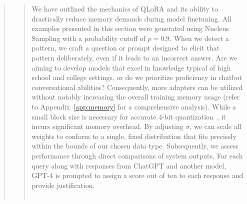 \begin{quote}
{\begin{abstract}
We have outlined the mechanics of QLoRA and its ability to drastically reduce memory demands during model finetuning. All examples presented in this section were generated using Nucleus Sampling \cite{holtzmancurious} with a probability cutoff of $p=0.9$. When we detect a pattern, we craft a question or prompt designed to elicit that pattern deliberately, even if it leads to an incorrect answer. Are we aiming to develop models that excel in knowledge typical of high school and college settings, or do we prioritize proficiency in chatbot conversational abilities? Consequently, more adapters can be utilized without notably increasing the overall training memory usage (refer to Appendix~\ref{app:memory} for a comprehensive analysis). While a small block size is necessary for accurate 4-bit quantization~\citep{dettmers2022case}, it incurs significant memory overhead. By adjusting $\sigma$, we can scale all weights to conform to a single, fixed distribution that fits precisely within the bounds of our chosen data type. Subsequently, we assess performance through direct comparisons of system outputs. For each query along with responses from ChatGPT and another model, GPT-4 is prompted to assign a score out of ten to each response and provide justification. \\ \\

\end{abstract}}
\end{quote}
